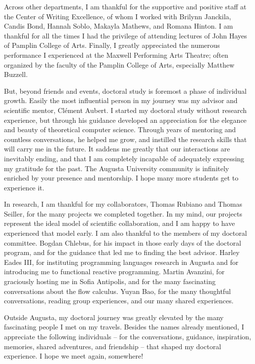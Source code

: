 Across other departments, I am thankful for the supportive and positive staff at the Center of Writing Excellence,
of whom I worked with Brilynn Janckila, Candis Bond, Hannah Soblo, Makayla Mathews, and Romana Hinton.
I am thankful for all the times I had the privilege of attending lectures of John Hayes of Pamplin College of Arts.
Finally, I greatly appreciated the numerous performance I experienced at the Maxwell Performing Arts Theatre;
often organized by the faculty of the Pamplin College of Arts, especially Matthew Buzzell.

But, beyond friends and events, doctoral study is foremost a phase of individual growth.
Easily the most influential person in my journey was my advisor and scientific mentor, Clément Aubert.
I started my doctoral study without research experience, but through his guidance developed an appreciation for the elegance and beauty of theoretical computer science.
Through years of mentoring and countless conversations, he helped me grow, and instilled the research skills that will carry me in the future.
It saddens me greatly that our interactions are inevitably ending, and that I am completely incapable of adequately expressing my gratitude for the past.
The Augusta University community is infinitely enriched by your presence and mentorship.
I hope many more students get to experience it.

In research, I am thankful for my collaborators, Thomas Rubiano and Thomas Seiller, for the many projects we completed together.
In my mind, our projects represent the ideal model of scientific collaboration, and I am happy to have experienced that model early.
I am also thankful to the members of my doctoral committee.
Bogdan Chlebus, for his impact in those early days of the doctoral program, and for the guidance that led me to finding the best advisor.
Harley Eades III, for instituting programming languages research in Augusta and for introducing me to functional reactive programming.
Martin Avanzini, for graciously hosting me in Sofia Antipolis, and for the many fascinating conversations about the flow calculus.
Yuyan Bao, for the many thoughtful conversations, reading group experiences, and our many shared experiences.

Outside Augusta, my doctoral journey was greatly elevated by the many fascinating people I met on my travels.
Besides the names already mentioned, I appreciate the following individuals %
-- for the conversations, guidance, inspiration, memories, shared adventures, and friendship --
that shaped my doctoral experience. I hope we meet again, somewhere!

